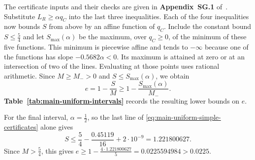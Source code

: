 \documentclass[preprint,11pt,numbers]{elsarticle-arxiv}
\numberwithin{equation}{section}
\theoremstyle{definition}
\begin{document}
The certificate inputs and their checks are given in
\textbf{Appendix~SG.1} of~\cite{FGSTSupplement}.
Substitute $L_R\geq\alpha q_C$ into the last three inequalities.
Each of the four inequalities now bounds $S$ from above by an
affine function of $q_C$. Include the constant bound
$S\leq\frac54$ and let $S_{\max}(\alpha)$ be the maximum, over
$q_C\geq0$, of the minimum of these five functions. This minimum
is piecewise affine and tends to $-\infty$ because one of the
functions has slope $-0.5682\alpha<0$. Its maximum is attained
at zero or at an intersection of two of the lines. Evaluating
at those points uses rational arithmetic. Since $M\geq M_->0$
and $S\leq S_{\max}(\alpha)$, we obtain
\[
 e=1-\frac{S}{M}\geq 1-\frac{S_{\max}(\alpha)}{M_-}.
\]
\textbf{Table~\ref{tab:main-uniform-intervals}} records the resulting
lower bounds on $e$.

For the final interval, $\alpha=\frac12$, so the last line of
\eqref{eq:main-uniform-simple-certificates} alone gives
\[
 S\leq\frac54-\frac{0.45119}{16}+2\cdot10^{-9}=1.221800627.
\]
Since $M>\frac{5}{4}$, this gives
$e\geq1-\frac{4\cdot1.221800627}{5}=0.0225594984>0.0225$.
\end{document}
